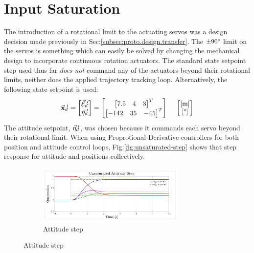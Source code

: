 \section{Input Saturation}
\label{sec:simulation.saturation}
The introduction of a rotational limit to the actuating servos was a design decision made previously in Sec:\ref{subsec:proto.design.transfer}. The $\pm 90\text{\textdegree}$ limit on the servos is something which can easily be solved by changing the mechanical design to incorporate continuous rotation actuators. The standard state setpoint step used thus far \emph{does not} command any of the actuators beyond their rotational limits, neither does the applied trajectory tracking loop. Alternatively, the following state setpoint is used:
\begin{equation}\label{eq:saturation-state-step}
\vec{\mathbf{x}}_d\text{}\hspace{-2pt}'=
\begin{bmatrix}
\vec{\mathcal{E}}_d\text{}\hspace{-2pt}'\\
\vec{\eta}_d\text{}\hspace{-2pt}'
\end{bmatrix}
=\begin{bmatrix}
\begin{bmatrix}
7.5 & 4 & 3
\end{bmatrix}^T
\\
\begin{bmatrix}
-142 & 35 & -45
\end{bmatrix}^T
\end{bmatrix}
~~~~\begin{bmatrix}
[\text{m}]\\
[\text{\textdegree}]
\end{bmatrix}
\end{equation}
The attitude setpoint, $\vec{\eta}_d\text{}\hspace{-2pt}'$, was chosen because it commands each servo beyond their rotational limit. When using Proprotional Derivative controllers for both position and attitude control loops, Fig:\ref{fig:unsaturated-step} shows that step response for attitude and positions collectively.
\begin{figure}[hbtp]
\vspace{-4pt}
\centering
\begin{subfigure}{\textwidth}
\centering
\includegraphics[width=0.8\textwidth]{graphs/unsaturated-attitude-step}
\vspace{-6pt}
\caption{Attitude step}
\label{fig:unsaturated-attitude-step}
\end{subfigure}
\vspace{-18pt}
\end{figure}
